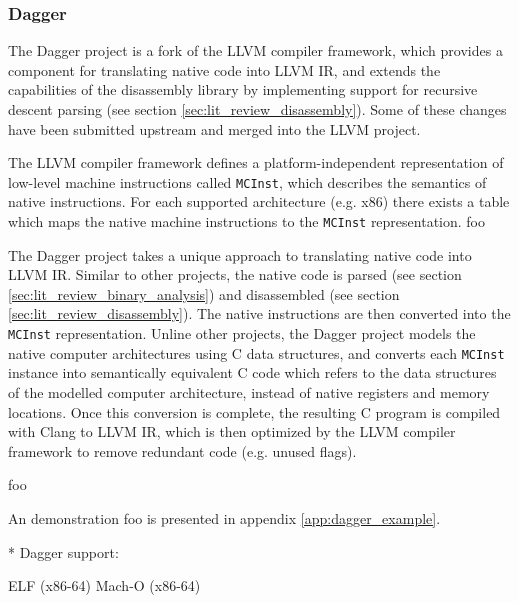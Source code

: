 
\subsubsection{Dagger}

The Dagger project is a fork of the LLVM compiler framework, which provides a component for translating native code into LLVM IR, and extends the capabilities of the disassembly library by implementing support for recursive descent parsing (see section \ref{sec:lit_review_disassembly}). Some of these changes have been submitted upstream and merged into the LLVM project.

The LLVM compiler framework defines a platform-independent representation of low-level machine instructions called \texttt{MCInst}, which describes the semantics of native instructions. For each supported architecture (e.g. x86) there exists a table which maps the native machine instructions to the \texttt{MCInst} representation. foo

The Dagger project takes a unique approach to translating native code into LLVM IR. Similar to other projects, the native code is parsed (see section \ref{sec:lit_review_binary_analysis}) and disassembled (see section \ref{sec:lit_review_disassembly}). The native instructions are then converted into the \texttt{MCInst} representation. Unline other projects, the Dagger project models the native computer architectures using C data structures, and converts each \texttt{MCInst} instance into semantically equivalent C code which refers to the data structures of the modelled computer architecture, instead of native registers and memory locations. Once this conversion is complete, the resulting C program is compiled with Clang to LLVM IR, which is then optimized by the LLVM compiler framework to remove redundant code (e.g. unused flags).

foo \cite{dagger}

An demonstration foo is presented in appendix \ref{app:dagger_example}.



* Dagger support:

ELF (x86-64)
Mach-O (x86-64)
